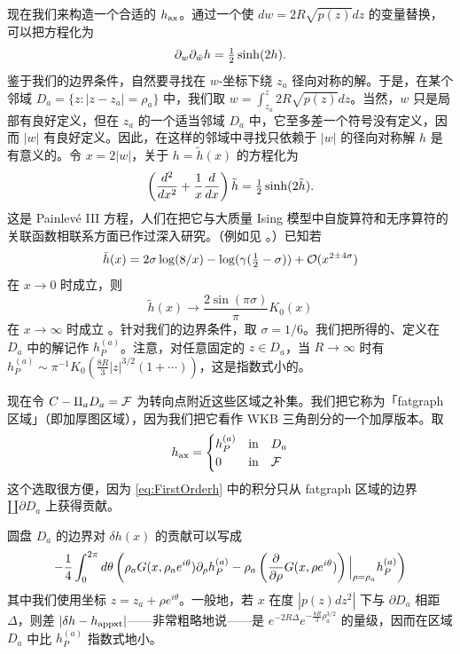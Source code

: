 现在我们来构造一个合适的 $h_{\rm ax}$。通过一个使 $dw=2R\sqrt{p(z)}dz$ 的变量替换，可以把方程化为
\begin{equation}\label{eq:2DSG}
\partial_w\partial_{\bar w}h = \tfrac{1}{2}\sinh(2h).
\end{equation}
鉴于我们的边界条件，自然要寻找在 $w$-坐标下绕 $z_a$ 径向对称的解。于是，在某个邻域 $D_a=\{z:|z-z_a|=\rho_a\}$ 中，我们取 $w=\int_{z_a}^z 2R\sqrt{p(z)}dz$。当然，$w$ 只是局部有良好定义，但在 $z_a$ 的一个适当邻域 $D_a$ 中，它至多差一个符号没有定义，因而 $|w|$ 有良好定义。因此，在这样的邻域中寻找只依赖于 $|w|$ 的径向对称解 $h$ 是有意义的。令 $x=2|w|$，关于 $h=\tilde h(x)$ 的方程化为
\begin{equation}
\left(\frac{d^2}{dx^2} + \frac{1}{x}\frac{d}{dx}\right)\tilde h = \tfrac{1}{2}\sinh(2\tilde h).
\end{equation}
这是 Painlevé III 方程，人们在把它与大质量 Ising 模型中自旋算符和无序算符的关联函数相联系方面已作过深入研究。（例如见 \cite{Fateev:1998xb}。）已知若
\begin{equation}\label{eq:conn1}
\tilde h(x) = 2\sigma\log(8/x) - \log(\gamma(\tfrac{1}{2}-\sigma)) + \mathcal{O}(x^{2\pm4\sigma})
\end{equation}
在 $x\to0$ 时成立，则
\begin{equation}\label{eq:conn2}
\tilde h(x) \to \frac{2\sin(\pi\sigma)}{\pi}K_0(x)
\end{equation}
在 $x\to\infty$ 时成立 \cite{McCoy:1976cd}。针对我们的边界条件，取 $\sigma=1/6$。我们把所得的、定义在 $D_a$ 中的解记作 $h_P^{(a)}$。注意，对任意固定的 $z\in D_a$，当 $R\to\infty$ 时有 $h_P^{(a)}\sim\pi^{-1}K_0(\frac{8R}{3}|z|^{3/2}(1+\cdots))$，这是指数式小的。

现在令 $C-\amalg_a D_a=\mathcal{F}$ 为转向点附近这些区域之补集。我们把它称为「fatgraph 区域」（即加厚图区域），因为我们把它看作 WKB 三角剖分的一个加厚版本。取
\begin{equation}
h_{\rm ax} = \begin{cases} h_P^{(a)} & {\rm in}\quad D_a \\ 0 & {\rm in}\quad \mathcal{F} \end{cases}
\end{equation}
这个选取很方便，因为 \eqref{eq:FirstOrderh} 中的积分只从 fatgraph 区域的边界 $\amalg\partial D_a$ 上获得贡献。

圆盘 $D_a$ 的边界对 $\delta h(x)$ 的贡献可以写成
\begin{equation}
-\frac{1}{4}\int_0^{2\pi}d\theta\left(\rho_a G(x,\rho_a e^{i\theta})\partial_\rho h_P^{(a)} - \rho_a\left(\frac{\partial}{\partial\rho}G(x,\rho e^{i\theta})\right)\Big|_{\rho=\rho_a}h_P^{(a)}\right)
\end{equation}
其中我们使用坐标 $z=z_a+\rho e^{i\theta}$。一般地，若 $x$ 在度 $|p(z)dz^2|$ 下与 $\partial D_a$ 相距 $\Delta$，则差 $|\delta h-h_{\rm appxt}|$——非常粗略地说——是 $e^{-2R\Delta}e^{-\frac{8R}{3}\rho_a^{3/2}}$ 的量级，因而在区域 $D_a$ 中比 $h_P^{(a)}$ 指数式地小。


